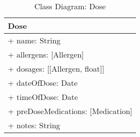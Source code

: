 \begin{table}[ht]
\centering
\caption{Class Diagram: Dose}

\hspace{1em}
\renewcommand{\arraystretch}{1.7}

\begin{tabular}{|l|}
\hline
\textbf{Dose} \\
\hline
+ name: String \\
+ allergens: [Allergen] \\
+ dosages: [[Allergen, float]] \\
+ dateOfDose: Date \\
+ timeOfDose: Date \\
+ preDoseMedications: [Medication] \\
+ notes: String \\
\hline
\end{tabular}
\end{table}
